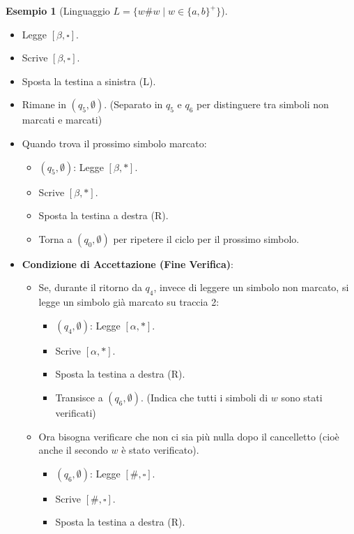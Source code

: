 \documentclass[a4paper]{article}
\theoremstyle{definition} %
\newtheorem{example}{Esempio}
\newcommand{\blankS}{\ensuremath{\square}}
\begin{document}
\begin{example}[Linguaggio $L = \{w\#w \mid w \in \{a,b\}^+\}$]
\begin{itemize}
\begin{itemize}
            \item Legge $[\beta, \blankS]$.
            \item Scrive $[\beta, \blankS]$.
            \item Sposta la testina a sinistra (L).
            \item Rimane in $(q_5, \emptyset)$. (Separato in $q_5$ e $q_6$ per distinguere tra simboli non marcati e marcati)
            \item Quando trova il prossimo simbolo marcato:
                \begin{itemize}
                    \item $(q_5, \emptyset)$: Legge $[\beta, *]$.
                    \item Scrive $[\beta, *]$.
                    \item Sposta la testina a destra (R).
                    \item Torna a $(q_0, \emptyset)$ per ripetere il ciclo per il prossimo simbolo.
                \end{itemize}
            \item \textbf{Condizione di Accettazione (Fine Verifica)}:
                \begin{itemize}
                    \item Se, durante il ritorno da $q_4$, invece di leggere un simbolo non marcato, si legge un simbolo già marcato su traccia 2:
                        \begin{itemize}
                            \item $(q_4, \emptyset)$: Legge $[\alpha, *]$.
                            \item Scrive $[\alpha, *]$.
                            \item Sposta la testina a destra (R).
                            \item Transisce a $(q_6, \emptyset)$. (Indica che tutti i simboli di $w$ sono stati verificati)
                        \end{itemize}
                    \item Ora bisogna verificare che non ci sia più nulla dopo il cancelletto (cioè anche il secondo $w$ è stato verificato).
                        \begin{itemize}
                            \item $(q_6, \emptyset)$: Legge $[\#, \blankS]$.
                            \item Scrive $[\#, \blankS]$.
                            \item Sposta la testina a destra (R).

\end{itemize}
\end{itemize}
\end{itemize}
\end{itemize}
\end{example}
\end{document}
